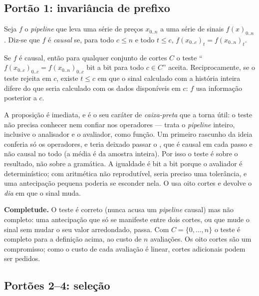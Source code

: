 \subsection{Portão 1: invariância de prefixo}

\begin{definicao}
Seja $f$ o \textit{pipeline} que leva uma série de preços $x_{0..n}$ a uma série de sinais $f(x)_{0..n}$. Diz-se que $f$ é \emph{causal} se, para todo $c \leq n$ e todo $t \leq c$, $f(x_{0..c})_t = f(x_{0..n})_t$.
\end{definicao}

\begin{proposicao}\label{prop:prefixo}
Se $f$ é causal, então para qualquer conjunto de cortes $C$ o teste ``$f(x_{0..c})_{0..c} = f(x_{0..n})_{0..c}$ bit a bit para todo $c \in C$'' aceita. Reciprocamente, se o teste rejeita em $c$, existe $t \leq c$ em que o sinal calculado com a história inteira difere do que seria calculado com os dados disponíveis em $c$: $f$ usa informação posterior a $c$.
\end{proposicao}

A proposição é imediata, e é o seu caráter de \emph{caixa-preta} que a torna útil: o teste não precisa conhecer nem confiar nos operadores --- trata o \textit{pipeline} inteiro, inclusive o analisador e o avaliador, como função. Um primeiro rascunho da ideia conferia só os operadores, e teria deixado passar o , que é causal em cada passo e não causal no todo (a média é da amostra inteira). Por isso o teste é sobre o resultado, não sobre a gramática. A igualdade é bit a bit porque o avaliador é determinístico; com aritmética não reprodutível, seria preciso uma tolerância, e uma antecipação pequena poderia se esconder nela. O \vapor{} usa oito cortes e devolve o \emph{dia} em que o sinal muda.

\begin{mestrado}
\textbf{Completude.} O teste é correto (nunca acusa um \textit{pipeline} causal) mas não completo: uma antecipação que só se manifeste entre dois cortes, ou que mude o sinal sem mudar o seu valor arredondado, passa. Com $C = \{0, \ldots, n\}$ o teste é completo para a definição acima, ao custo de $n$ avaliações. Os oito cortes são um compromisso; como o custo de cada avaliação é linear, cortes adicionais podem ser pedidos.
\end{mestrado}

\subsection{Portões 2--4: seleção}

